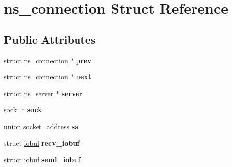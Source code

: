 \hypertarget{structns__connection}{\section{ns\-\_\-connection Struct Reference}
\label{structns__connection}
}
\subsection*{Public Attributes}
\begin{DoxyCompactItemize}
\item 
\hypertarget{structns__connection_a904d1cde04d0d773000c9da474df3069}{struct \hyperlink{structns__connection}{ns\-\_\-connection} $\ast$ {\bfseries prev}}\label{structns__connection_a904d1cde04d0d773000c9da474df3069}

\item 
\hypertarget{structns__connection_a5ae0b1d1db0ad28c7e533a09dcebcd64}{struct \hyperlink{structns__connection}{ns\-\_\-connection} $\ast$ {\bfseries next}}\label{structns__connection_a5ae0b1d1db0ad28c7e533a09dcebcd64}

\item 
\hypertarget{structns__connection_aa0086348300a1ecf53b25f8973be9535}{struct \hyperlink{structns__server}{ns\-\_\-server} $\ast$ {\bfseries server}}\label{structns__connection_aa0086348300a1ecf53b25f8973be9535}

\item 
\hypertarget{structns__connection_a6a5131aa2ce6cfb7bb7d1ba346014fa5}{sock\-\_\-t {\bfseries sock}}\label{structns__connection_a6a5131aa2ce6cfb7bb7d1ba346014fa5}

\item 
\hypertarget{structns__connection_a2993b03ed9a1740a85655dfe4e3df0fa}{union \hyperlink{unionsocket__address}{socket\-\_\-address} {\bfseries sa}}\label{structns__connection_a2993b03ed9a1740a85655dfe4e3df0fa}

\item 
\hypertarget{structns__connection_a55e16160bc2e7865ed90ce108e91724c}{struct \hyperlink{structiobuf}{iobuf} {\bfseries recv\-\_\-iobuf}}\label{structns__connection_a55e16160bc2e7865ed90ce108e91724c}

\item 
\hypertarget{structns__connection_a8415869449641f4f20387f40abaed4de}{struct \hyperlink{structiobuf}{iobuf} {\bfseries send\-\_\-iobuf}}\label{structns__connection_a8415869449641f4f20387f40abaed4de}


\end{DoxyCompactItemize}
